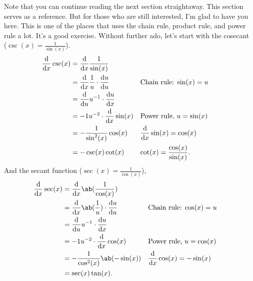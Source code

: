 Note that you can continue reading the next section straightaway. This section serves as a reference. But for those who are still interested, I'm glad to have you here. This is one of the places that uses the chain rule, product rule, and power rule a lot. It's a good exercise. Without further ado, let's start with the cosecant ($\csc(x) = \frac{1}{\sin(x)}$).
\begin{align}
	\odv*{\csc(x)}{x} &= \odv*{\frac{1}{\sin(x)}}{x} \\
						&= \odv*{\frac{1}{u}}{x} \cdot \odv{u}{u} && \textrm{Chain rule: $\sin(x) = u$} \\
						&= \odv*{u^{-1}}{u} \cdot \odv{u}{x} \\
						&= -1u^{-2}\cdot\odv*{\sin(x)}{x} && \textrm{Power rule, $u = \sin(x)$} \\
						&= -\frac{1}{\sin^2(x)}\cos(x) && \textrm{$\odv*{\sin(x)}{x} = \cos(x)$} \\
						&= -\csc(x)\cot(x) && \textrm{$\cot(x) = \frac{\cos(x)}{\sin(x)}$}.
\end{align}
And the secant function ($\sec(x) = \frac{1}{\cos(x)}$),
\begin{align}
	\odv*{\sec(x)}{x} &= \odv*{\ab(\frac{1}{\cos(x)})}{x} \\
					  &= \odv*{\ab(\frac{1}{u})}{x} \cdot \odv{u}{u} && \textrm{Chain rule: $\cos(x) = u$} \\
					  &= \odv*{u^{-1}}{u} \cdot \odv{u}{x} \\
					  &= -1u^{-2}\cdot\odv*{\cos(x)}{x} && \textrm{Power rule, $u = \cos(x)$}\\
					  &= -\frac{1}{\cos^{2}(x)}\ab(-\sin(x)) && \textrm{$\odv*{\cos(x)}{x} = -\sin(x)$} \\
					  &= \sec(x)\tan(x).
\end{align}

